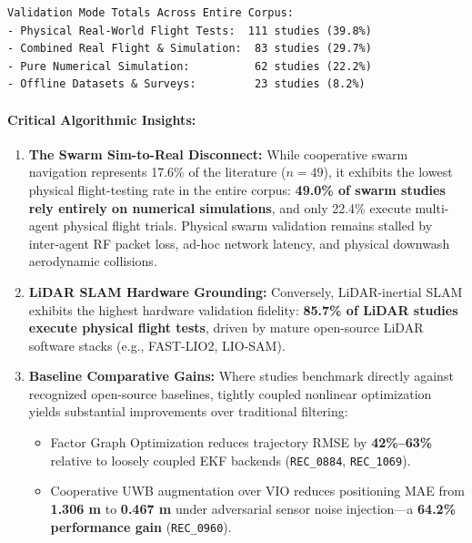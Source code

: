 \documentclass[journal]{IEEEtran}
\begin{document}
\begin{verbatim}
Validation Mode Totals Across Entire Corpus:
- Physical Real-World Flight Tests:  111 studies (39.8%)
- Combined Real Flight & Simulation:  83 studies (29.7%)
- Pure Numerical Simulation:          62 studies (22.2%)
- Offline Datasets & Surveys:         23 studies (8.2%)
\end{verbatim}

\paragraph{Critical Algorithmic
Insights:}\label{critical-algorithmic-insights}

\begin{enumerate}
\def\labelenumi{\arabic{enumi}.}
\tightlist
\item
  \textbf{The Swarm Sim-to-Real Disconnect:} While cooperative swarm
  navigation represents 17.6\% of the literature (\(n = 49\)), it
  exhibits the lowest physical flight-testing rate in the entire corpus:
  \textbf{49.0\% of swarm studies rely entirely on numerical
  simulations}, and only 22.4\% execute multi-agent physical flight
  trials. Physical swarm validation remains stalled by inter-agent RF
  packet loss, ad-hoc network latency, and physical downwash aerodynamic
  collisions.
\item
  \textbf{LiDAR SLAM Hardware Grounding:} Conversely, LiDAR-inertial
  SLAM exhibits the highest hardware validation fidelity: \textbf{85.7\%
  of LiDAR studies execute physical flight tests}, driven by mature
  open-source LiDAR software stacks (e.g., FAST-LIO2, LIO-SAM).
\item
  \textbf{Baseline Comparative Gains:} Where studies benchmark directly
  against recognized open-source baselines, tightly coupled nonlinear
  optimization yields substantial improvements over traditional
  filtering:

  \begin{itemize}
  \tightlist
  \item
    Factor Graph Optimization reduces trajectory RMSE by
    \textbf{42\%--63\%} relative to loosely coupled EKF backends
    (\texttt{REC\_0884}, \texttt{REC\_1069}).
  \item
    Cooperative UWB augmentation over VIO reduces positioning MAE from
    \textbf{1.306 m} to \textbf{0.467 m} under adversarial sensor noise
    injection---a \textbf{64.2\% performance gain} (\texttt{REC\_0960}).
  \end{itemize}
\end{enumerate}
\end{document}
